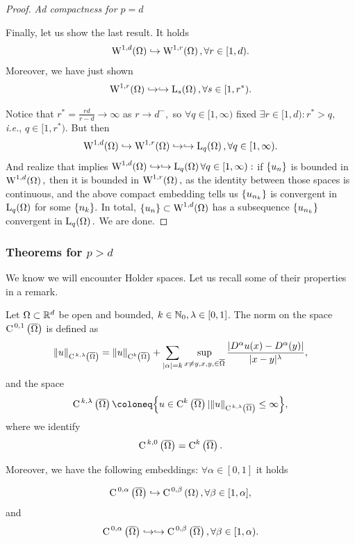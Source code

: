 \documentclass{article}
\begin{document}
\begin{proof}
	\textit{Ad compactness for $p=d$}

	Finally, let us show the last result. It holds
	\[
		\WkpSet[1][d]{\Omega} \hookrightarrow \WkpSet[1][r]{\Omega}, \forall r \in [1,d).
	\]
	Moreover, we have just shown
	\[
		\WkpSet[1][r]{\Omega} \hookrightarrow \hookrightarrow \LpSet[s]{\Omega}, \forall s \in [1,r^{*}).
	\]

	Notice that $r^{*} = \frac{rd}{r-d} \to \infty$ as $r \to d^-,$ so $\forall q \in [1,\infty)$ fixed $\exists r \in [1,d): r^{*} > q,$ \textit{i.e.}, $q \in [1, r^{*}).$ But then
	\[
		\WkpSet[1][d]{\Omega} \hookrightarrow \WkpSet[1][r]{\Omega} \hookrightarrow \hookrightarrow \LpSet[q]{\Omega}, \forall q \in [1,\infty).
	\]
	And realize that implies $\WkpSet[1][d]{\Omega} \hookrightarrow \hookrightarrow \LpSet[q]{\Omega} \forall q \in [1,\infty):$ if $\qty{u_n}$ is bounded in $\WkpSet[1][d]{\Omega},$ then it is bounded in $\WkpSet[1][r]{\Omega},$ as the identity between those spaces is continuous, and the above compact embedding tells us $\qty{u_{n_k}}$ is convergent in $\LpSet[q]{\Omega}$ for some $\qty{n_k}.$ In total, $\qty{u_n} \subset \WkpSet[1][d]{\Omega}$ has a subsequence $\qty{u_{n_k}}$ convergent in $\LpSet[q]{\Omega}.$ We are done.
\end{proof}

\subsubsection{Theorems for $p>d$}
\label{sec:emedding_p_ge_q}
We know we will encounter Holder spaces. Let us recall some of their properties in a remark.


\begin{remark}
	Let $\Omega \subset {\mathbb R}^{d}$ be open and bounded, $k \in {\mathbb N}_0, \lambda \in [0,1]$. The norm on the space $\text{C}^{\!\, \,0,1}\!\,\left(\overline{\Omega} \right)$ is defined as
	\[
		\norm{u}_{\text{C}^{\!\, \,k,\lambda}\!\,\left(\overline{\Omega} \right)} = \norm{u}_{\text{C}^{k}\!\,\left(\overline{\Omega} \right)} + \sum_{|\alpha| = k}\sup_{x \neq y, x,y, \in \overline{\Omega}}\frac{|D^{\alpha}u(x) - D^{\alpha}(y)|}{|x-y|^{\lambda}},
	\]
	and the space
	\[
		\CklSet{k}{\lambda}{\overline{\Omega}} \coloneq \qty{u \in \CkSet{k}{\overline{\Omega}}| \norm{u}_{\CklSet{k}{\lambda}{\overline{\Omega}}} \leq \infty},
	\]
	where we identify
	\[
		\text{C}^{\!\, \,k,0}\!\,\left(\overline{\Omega} \right) = \text{C}^{k}\!\,\left(\overline{\Omega} \right).
	\]

	Moreover, we have the following embeddings: $\forall \alpha \in [0,1]$ it holds

	\[
		\text{C}^{\!\, \,0,\alpha}\!\,\left(\overline{\Omega} \right) \hookrightarrow \text{C}^{\!\, \,0,\beta}\!\,\left(\Omega \right), \forall \beta \in [1, \alpha],
	\]
	and 
	\[
		\text{C}^{\!\, \,0,\alpha}\!\,\left(\overline{\Omega} \right) \hookrightarrow \hookrightarrow \text{C}^{\!\, \,0,\beta}\!\,\left(\overline{\Omega} \right), \forall \beta \in [1,\alpha).
	\]


\end{remark}
\end{document}
